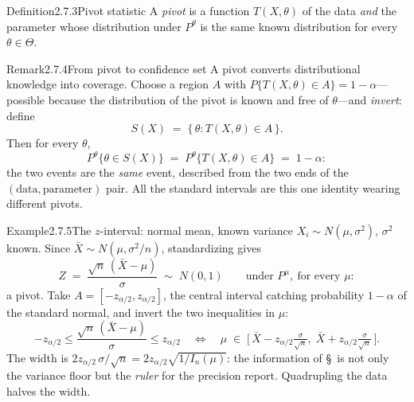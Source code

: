 \documentclass[main.tex]{subfiles}
\begin{document}
\begin{Obj}{Definition}{2.7.3}{Pivot statistic}
A \emph{pivot} is a function $T(X,\theta)$ of the data \emph{and} the parameter whose
distribution under $P^{\theta}$ is the same known distribution for every
$\theta\in\Theta$.
\end{Obj}

\begin{ObjL}{Remark}{2.7.4}{From pivot to confidence set}
A pivot converts distributional knowledge into coverage. Choose a region $A$ with
$P\{T(X,\theta)\in A\}=1-\alpha$---possible because the distribution of the pivot is known
and free of $\theta$---and \emph{invert}: define
\[ S(X) \;=\; \{\, \theta : T(X,\theta)\in A \,\} . \]
Then for every $\theta$,
\[ P^{\theta}\{\theta\in S(X)\} \;=\; P^{\theta}\{T(X,\theta)\in A\} \;=\; 1-\alpha : \]
the two events are the \emph{same} event, described from the two ends of the
$(\text{data},\text{parameter})$ pair. All the standard intervals are this one identity
wearing different pivots.
\end{ObjL}

\begin{ObjL}{Example}{2.7.5}{The $z$-interval: normal mean, known variance}
$X_i\sim N(\mu,\sigma^2)$, $\sigma^2$ known. Since $\bar X\sim N(\mu,\sigma^2/n)$,
standardizing gives
\[ Z \;=\; \frac{\sqrt n\,(\bar X-\mu)}{\sigma} \;\sim\; N(0,1)
   \qquad\text{under } P^{\mu},\ \text{for every } \mu : \]
a pivot. Take $A=[-z_{\alpha/2},z_{\alpha/2}]$, the central interval catching probability
$1-\alpha$ of the standard normal, and invert the two inequalities in $\mu$:
\[ -z_{\alpha/2} \le \frac{\sqrt n\,(\bar X-\mu)}{\sigma} \le z_{\alpha/2}
   \quad\Longleftrightarrow\quad
   \mu \;\in\; \Big[\, \bar X - z_{\alpha/2}\tfrac{\sigma}{\sqrt n},\;
   \bar X + z_{\alpha/2}\tfrac{\sigma}{\sqrt n} \,\Big] . \]
The width is $2z_{\alpha/2}\,\sigma/\sqrt n = 2z_{\alpha/2}\sqrt{1/I_n(\mu)}$: the
information of \S\, is not only the variance floor but the \emph{ruler} for the
precision report. Quadrupling the data halves the width.
\end{ObjL}
\end{document}
